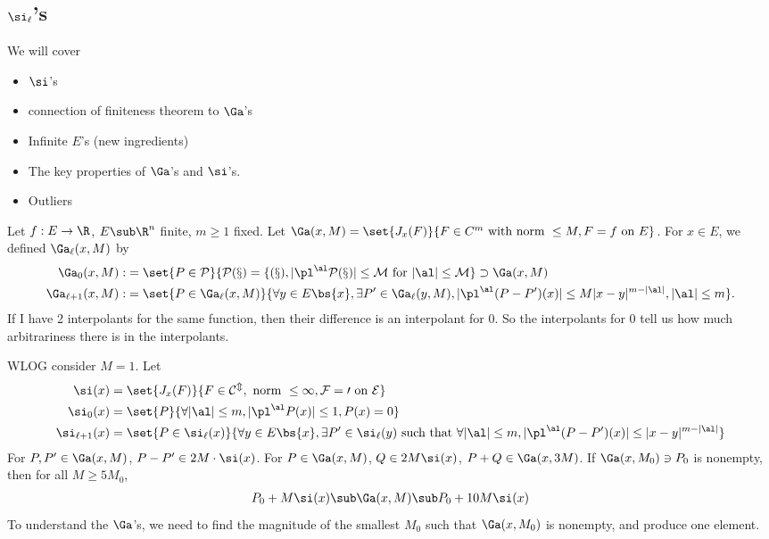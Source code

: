 
\subsection{$\si_\ell$'s}

We will cover
\begin{itemize}
\item
$\si$'s
\item
connection of finiteness theorem to $\Ga$'s
\item
Infinite $E$'s (new ingredients)
\item
The key properties of $\Ga$'s and $\si$'s.
\item 
Outliers
\end{itemize}

Let $f:E\to \R$, $E\sub \R^n$ finite, $m\ge 1$ fixed. Let $\Ga(x,M) = \set{J_x(F)}{F\in C^m \text{ with norm }\le M, F=f\text{ on }E}$. For $x\in E$, we defined $\Ga_\ell (x,M)$ by 
\begin{align}
\Ga_0(x,M) :&= \set{P\in \cal P}{P(x)=f(x), |\pl^\al P(x)|\le M\text{ for }|\al|\le M}\supset \Ga(x,M)\\
\Ga_{\ell+1}(x,M) :&= 
\set{P\in \Ga_\ell(x,M)}{\forall y\in E\bs \{x\}, \exists P'\in \Ga_\ell(y,M), |\pl^\al(P-P')(x)|\le M|x-y|^{m-|\al|}, |\al|\le m}.
\end{align}
If I have 2 interpolants for the same function, then their difference is an interpolant for 0. So the interpolants for 0 tell us how much arbitrariness there is in the interpolants. 

WLOG consider $M=1$.
Let 
\begin{align}
\si(x) &= \set{J_x(F)}{F\in \cal C^m, \text{ norm }\le 1, F=0\text{ on }E}\\
\si_0(x) &=\set{P}{\forall |\al|\le m,|\pl^\al P(x)|\le 1, P(x)=0}\\
\si_{\ell+1}(x)&=\set{P\in \si_\ell(x)}{\forall y\in E\bs \{x\}, \exists P'\in \si_\ell(y)\text{ such that }\forall |\al|\le m, |\pl^\al(P-P')(x)|\le |x-y|^{m-|\al|}}
\end{align}
For $P,P'\in \Ga(x,M)$, $P-P'\in 2M \cdot \si(x)$. For $P\in \Ga(x,M)$, $Q\in 2M\si(x)$, $P+Q\in \Ga(x,3M)$. 
If $\Ga(x,M_0)\ni P_0$ is nonempty, then for all $M\ge 5M_0$, 
\begin{align}
P_0+M\si(x) \sub \Ga(x,M) \sub P_0+10M\si(x)
\end{align}
To understand the $\Ga$'s,  we need to find the magnitude of the smallest $M_0$ such that $\Ga(x,M_0)$ is nonempty, and produce one element. 

